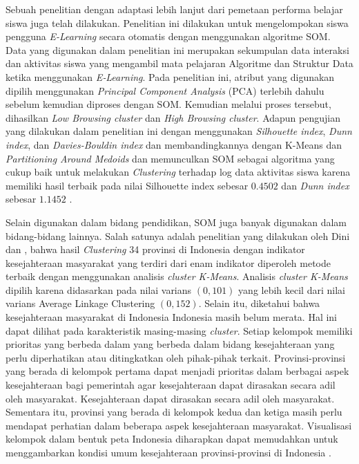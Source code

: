 Sebuah penelitian dengan adaptasi lebih lanjut dari pemetaan performa belajar siswa juga telah dilakukan. Penelitian ini dilakukan untuk mengelompokan siswa pengguna \textit{E-Learning} secara otomatis dengan menggunakan algoritme SOM. Data yang digunakan dalam penelitian ini merupakan sekumpulan data interaksi dan aktivitas siswa yang mengambil mata pelajaran  Algoritme dan  Struktur Data ketika  menggunakan \textit{E‐Learning}. Pada penelitian ini, atribut yang digunakan dipilih menggunakan \textit{Principal Component Analysis} (PCA) terlebih dahulu sebelum kemudian diproses dengan SOM. Kemudian melalui proses tersebut, dihasilkan \textit{Low Browsing cluster} dan \textit{High Browsing cluster}. Adapun pengujian yang dilakukan dalam penelitian ini dengan menggunakan \textit{Silhouette index}, \textit{Dunn index}, dan \textit{Davies-Bouldin index} dan membandingkannya dengan K-Means dan \textit{Partitioning Around Medoids} dan memunculkan SOM sebagai algoritma yang cukup baik untuk melakukan \textit{Clustering} terhadap log data aktivitas siswa karena memiliki hasil terbaik pada nilai Silhouette index sebesar $0.4502$ dan \textit{Dunn index} sebesar $1.1452$ \citep{Alias2017}.

Selain digunakan dalam bidang pendidikan, SOM juga banyak digunakan dalam  bidang-bidang  lainnya. Salah  satunya  adalah  penelitian  yang  dilakukan oleh Dini dan \citet{Dini2020}, bahwa hasil \textit{Clustering} 34 provinsi di Indonesia dengan indikator kesejahteraan masyarakat yang terdiri dari enam indikator diperoleh metode terbaik dengan menggunakan analisis \textit{cluster K-Means}. Analisis \textit{cluster K-Means} dipilih karena didasarkan pada nilai varians $(0,101)$ yang lebih kecil dari nilai varians Average Linkage Clustering $(0,152)$. Selain itu, diketahui bahwa kesejahteraan masyarakat di Indonesia Indonesia masih belum merata. Hal ini dapat dilihat pada karakteristik masing-masing \textit{cluster}. Setiap kelompok memiliki prioritas yang berbeda dalam yang berbeda dalam bidang kesejahteraan yang perlu diperhatikan atau ditingkatkan oleh pihak-pihak terkait. Provinsi-provinsi yang berada di kelompok pertama dapat menjadi prioritas dalam berbagai aspek kesejahteraan bagi pemerintah agar kesejahteraan dapat dirasakan secara adil oleh masyarakat. Kesejahteraan dapat dirasakan secara adil oleh masyarakat. Sementara itu, provinsi yang berada di kelompok kedua dan ketiga masih perlu mendapat perhatian dalam beberapa aspek kesejahteraan masyarakat. Visualisasi kelompok dalam bentuk peta Indonesia diharapkan dapat memudahkan untuk menggambarkan kondisi umum kesejahteraan provinsi-provinsi di Indonesia \citep{Dini2020}.

